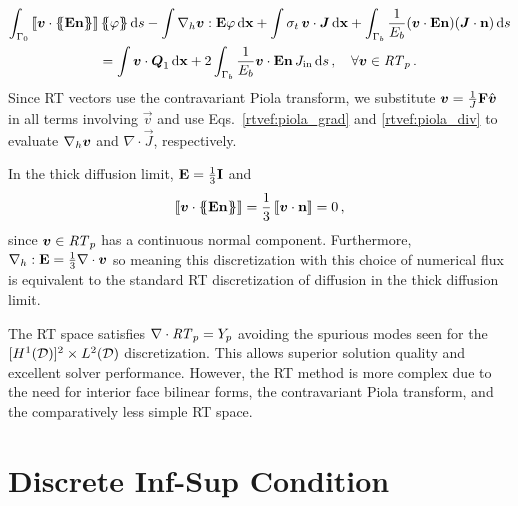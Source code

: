 \documentclass[../doc.tex]{subfiles}
\begin{document}
	\begin{multline}
		\int_{\Gamma_0} \jump{\vec{v}\cdot\avg{\E\n}} \avg{\varphi} \ud s - \int \nablah \vec{v} : \E\varphi \ud \x + \int \sigma_t\, \vec{v}\cdot\vec{J} \ud \x + \int_{\Gamma_b} \frac{1}{E_b}\!\paren{\vec{v}\cdot\E\n}\!\paren{\vec{J}\cdot\n} \ud s \\= \int \vec{v}\cdot\vec{Q}_1 \ud \x + 2\int_{\Gamma_b} \frac{1}{E_b}\vec{v}\cdot\E\n\, \Jin \ud s \,, \quad \forall \vec{v} \in \RT_p \,. 
	\end{multline}
Since RT vectors use the contravariant Piola transform, we substitute $\boldsymbol{v} = \frac{1}{J}\boldsymbol{\mathrm{F}}\hat{\boldsymbol{v}}$ in all terms involving $\vec{v}$ and use Eqs.~\ref{rtvef:piola_grad} and \ref{rtvef:piola_div} to evaluate $\nabla_h\boldsymbol{v}$ and $\nabla\cdot\vec{J}$, respectively. 

In the thick diffusion limit, $\boldsymbol{\mathrm{E}} = \frac{1}{3}\boldsymbol{\mathrm{I}}$ and 
	\begin{equation}
		\left\llbracket\boldsymbol{v}\cdot\left\{\!\!\left\{\boldsymbol{\mathrm{E}}\boldsymbol{\mathrm{n}}\right\}\!\!\right\} \right\rrbracket = \frac{1}{3}\left\llbracket\boldsymbol{v}\cdot\boldsymbol{\mathrm{n}} \right\rrbracket = 0 \,, 
	\end{equation}
since $\boldsymbol{v} \in \mathit{RT}_p$ has a continuous normal component. Furthermore, $\nabla_h:\boldsymbol{\mathrm{E}} = \frac{1}{3}\nabla\cdot\boldsymbol{v}$ so meaning this discretization with this choice of numerical flux is equivalent to the standard RT discretization of diffusion in the thick diffusion limit. 

The RT space satisfies $\nabla\cdot\mathit{RT}_p = Y_p$ avoiding the spurious modes seen for the $[H^1(\mathcal{D})]^2 \times L^2(\mathcal{D})$ discretization. This allows superior solution quality and excellent solver performance. However, the RT method is more complex due to the need for interior face bilinear forms, the contravariant Piola transform, and the comparatively less simple RT space. 

\section{Discrete Inf-Sup Condition}
\end{document}
